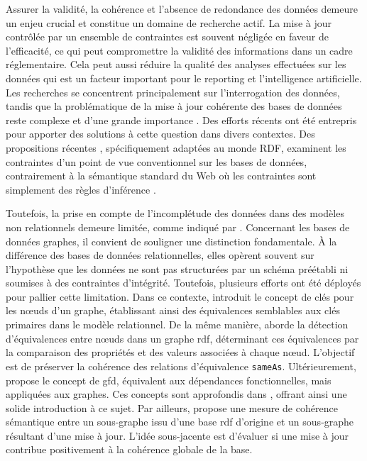Assurer la validité, la cohérence et l'absence de redondance des données demeure un enjeu crucial et constitue un domaine de recherche actif.
La mise à jour contrôlée par un ensemble de contraintes est souvent négligée en faveur de l'efficacité, ce qui peut compromettre la validité des informations dans un cadre réglementaire.
Cela peut aussi réduire la qualité des analyses effectuées sur les données qui est un facteur important pour le reporting et l'intelligence artificielle.
Les recherches se concentrent principalement sur l'interrogation des données, tandis que la problématique de la mise à jour cohérente des bases de données reste complexe et d'une grande importance \cite{halfeld-ferrariUpdateRulesDatalog1998,scheweLimitationsRuleTriggering1998,linkArithmeticTheoryConsistency2002}.
Des efforts récents ont été entrepris pour apporter des solutions à cette question dans divers contextes.
Des propositions récentes \cite{akhtarConstraintsRDF2011,flourisFormalFoundationsRDF2013,halfed-ferrariRDFUpdatesConstraints2017,halfeld-ferrariUpdatingRDFDatabases2017}, spécifiquement adaptées au monde RDF, examinent les contraintes d'un point de vue conventionnel sur les bases de données, contrairement à la sémantique standard du Web où les contraintes sont simplement des règles d'inférence \cite{lausenSPARQLingConstraintsRDF2008,gottlobOntologicalQueriesRewriting2011,patel-schneiderUsingDescriptionLogics2015}.

Toutefois, la prise en compte de l'incomplétude des données dans des modèles non relationnels demeure limitée, comme indiqué par \cite{sirangeloRepresentingQueryingIncomplete2014}.
Concernant les bases de données graphes, il convient de souligner une distinction fondamentale.
À la différence des bases de données relationnelles, elles opèrent souvent sur l'hypothèse que les données ne sont pas structurées par un schéma préétabli ni soumises à des contraintes d'intégrité.
Toutefois, plusieurs efforts ont été déployés pour pallier cette limitation.
Dans ce contexte, \cite{fanKeysGraphs2015} introduit le concept de clés pour les nœuds d'un graphe, établissant ainsi des équivalences semblables aux clés primaires dans le modèle relationnel.
De la même manière, \cite{raadDetectionLiensIdentite2018} aborde la détection d'équivalences entre nœuds dans un graphe \gls{rdf}, déterminant ces équivalences par la comparaison des propriétés et des valeurs associées à chaque nœud.
L'objectif est de préserver la cohérence des relations d'équivalence \verb|sameAs|.
Ultérieurement, \cite{fanDependenciesGraphs2019} propose le concept de \gls{gfd}, équivalent aux dépendances fonctionnelles, mais appliquées aux graphes.
Ces concepts sont approfondis dans \cite{anglesPgkeysKeysProperty2021,bonifatiQueryingGraphs2018}, offrant ainsi une solide introduction à ce sujet.
Par ailleurs, \cite{maillotConsistencyEvaluationRDF2014} propose une mesure de cohérence sémantique entre un sous-graphe issu d'une base \gls{rdf} d'origine et un sous-graphe résultant d'une mise à jour.
L'idée sous-jacente est d'évaluer si une mise à jour contribue positivement à la cohérence globale de la base.

